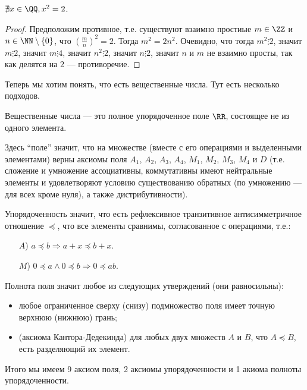 \documentclass[12pt,a4paper]{article}
\begin{document}
    \begin{theorem}
        $\nexists x\in \QQ, x^2 = 2$.
    \end{theorem}

    \begin{proof}
        Предположим противное, т.е. существуют взаимно простиые $m \in \ZZ$ и $n \in \NN\setminus\{0\}$, что $(\frac{m}{n})^2 = 2$. Тогда $m^2 = 2n^2$. Очевидно, что тогда $m^2 \vdots 2$, значит $m\vdots 2$, значит $m\vdots 4$, значит $n^2 \vdots 2$, значит $n \vdots 2$, значит $n$ и $m$ не взаимно просты, так как делятся на $2$ --- противоречие.
    \end{proof}

    Теперь мы хотим понять, что есть вещественные числа. Тут есть несколько подходов.

    \begin{definition}
        Вещественные числа --- это полное упорядоченное поле $\RR$, состоящее не из одного элемента.

        Здесь ``поле'' значит, что на множестве (вместе с его операциями и выделенными элементами) верны аксиомы поля $A_1$, $A_2$, $A_3$, $A_4$, $M_1$, $M_2$, $M_3$, $M_4$ и $D$ (т.е. сложение и умножение ассоциативны, коммутативны имеют нейтральные элементы и удовлетворяют условию существованию обратных (по умножению --- для всех кроме нуля), а также дистрибутивности).

        Упорядоченность значит, что есть рефлексивное транзитивное антисимметричное отношение $\preccurlyeq$, что все элементы сравнимы, согласованное с операциями, т.е.:
        \begin{itemize}
            \item[$A$)] $a \preccurlyeq b \Rightarrow a + x \preccurlyeq b + x$.
            \item[$M$)] $0 \preccurlyeq a \wedge 0 \preccurlyeq b \Rightarrow 0 \preccurlyeq ab$.
        \end{itemize}

        Полнота поля значит любое из следующих утверждений (они равносильны):
        \begin{itemize}
            \item любое ограниченное сверху (снизу) подмножество поля имеет точную верхнюю (нижнюю) грань;
            \item (аксиома Кантора-Дедекинда) для любых двух множеств $A$ и $B$, что $A \preccurlyeq B$, есть разделяющий их элемент.
        \end{itemize}

        Итого мы имеем 9 аксиом поля, 2 аксиомы упорядоченности и 1 акиома полноты упорядоченности.
    \end{definition}
\end{document}
